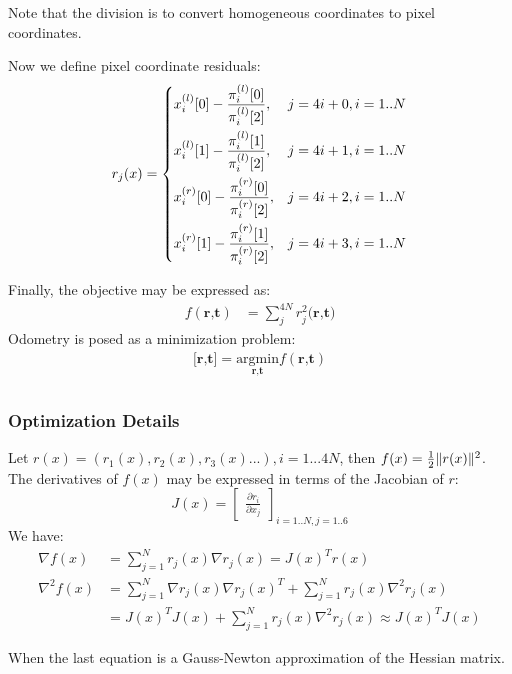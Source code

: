 \documentclass[10pt]{article}         %
\DeclarePairedDelimiter\norm{\lVert}{\rVert}%
\begin{document}
\begin{enumerate}
Note that the division is to convert homogeneous coordinates to pixel coordinates.

Now we define pixel coordinate residuals:
\[
r_j(x)= 
\begin{dcases}
  x_i^{(l)}[0]-\frac{\pi_i^{(l)}[0]}{\pi_i^{(l)}[2]},&  j = 4i+0, i=1..N\\
  x_i^{(l)}[1]-\frac{\pi_i^{(l)}[1]}{\pi_i^{(l)}[2]},&  j = 4i+1, i=1..N\\
  x_i^{(r)}[0]-\frac{\pi_i^{(r)}[0]}{\pi_i^{(r)}[2]},&  j = 4i+2, i=1..N\\
  x_i^{(r)}[1]-\frac{\pi_i^{(r)}[1]}{\pi_i^{(r)}[2]},&  j = 4i+3, i=1..N
\end{dcases}
\]

Finally, the objective may be expressed as:
\begin{align*}
f(\textbf{r,t})&=\sum_j^{4N} r_j^2\textbf{(r,t)}
\end{align*}
Odometry is posed as a minimization problem:
\begin{equation*}
\begin{aligned}
\textbf{[r,t]} = \underset{\textbf{r,t}}{\text{argmin}} f(\textbf{r,t})\\
\end{aligned}
\end{equation*}

\end{enumerate}

\subsubsection{Optimization Details}
\label{sec: optimization}
Let $r(x) = (r_1(x),r_2(x),r_3(x)...),i=1...4N$, then $f(x) = \frac{1}{2}\norm{r(x)}^2$.  The derivatives of $f(x)$ may be expressed in terms of the Jacobian of $r$:
$$
J(x) = \begin{bmatrix}\frac{\partial r_i}{\partial x_j} \end{bmatrix}_{i=1..N,j=1..6}
$$
We have:
\begin{align*}
\nabla f(x) &= \sum_{j=1}^{N}r_j(x)\nabla r_j(x)=J(x)^Tr(x)\\
\nabla^2 f(x) &= \sum_{j=1}^N\nabla r_j(x)\nabla r_j(x)^T+\sum_{j=1}^{N}r_j(x)\nabla^2 r_j(x)\\
&= J(x)^TJ(x) + \sum_{j=1}^{N}r_j(x)\nabla^2 r_j(x) \approx  J(x)^TJ(x)
\end{align*}

When the last equation is a Gauss-Newton approximation of the Hessian matrix.
\end{document}
